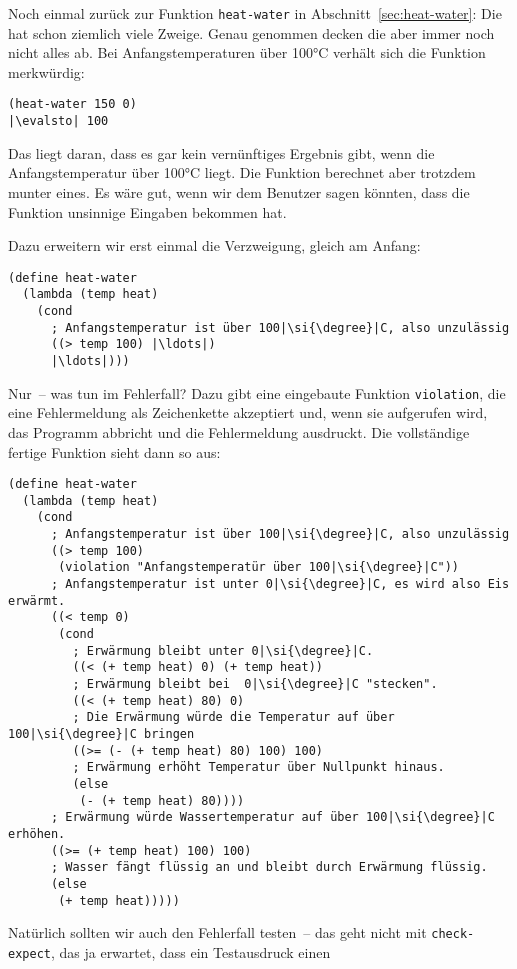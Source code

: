 Noch einmal zurück zur Funktion \lstinline{heat-water} in
Abschnitt~\ref{sec:heat-water}: Die hat schon ziemlich viele Zweige.
Genau genommen decken die aber immer noch nicht alles ab.  %
Bei Anfangstemperaturen über 100\si{\degree}C verhält sich die Funktion merkwürdig:
%
\begin{lstlisting}
(heat-water 150 0)
|\evalsto| 100
\end{lstlisting}
%
Das liegt daran, dass es gar kein vernünftiges Ergebnis gibt, wenn die
Anfangstemperatur über 100\si{\degree}C liegt.  Die Funktion berechnet aber
trotzdem munter eines.  Es wäre gut, wenn wir dem Benutzer sagen
könnten, dass die Funktion unsinnige Eingaben bekommen hat.

Dazu erweitern wir erst einmal die Verzweigung, gleich am Anfang:
%
\begin{lstlisting}
(define heat-water
  (lambda (temp heat)
    (cond
      ; Anfangstemperatur ist über 100|\si{\degree}|C, also unzulässig
      ((> temp 100) |\ldots|)
      |\ldots|)))
\end{lstlisting}
%
Nur~-- was tun im Fehlerfall?  Dazu gibt eine eingebaute Funktion
\lstinline{violation},\label{sec:violation} die eine Fehlermeldung als Zeichenkette akzeptiert
und, wenn sie aufgerufen wird, das Programm abbricht und die
Fehlermeldung ausdruckt.  Die vollständige fertige Funktion sieht
dann so aus:
%
\begin{lstlisting}
(define heat-water
  (lambda (temp heat)
    (cond
      ; Anfangstemperatur ist über 100|\si{\degree}|C, also unzulässig
      ((> temp 100)
       (violation "Anfangstemperatür über 100|\si{\degree}|C"))
      ; Anfangstemperatur ist unter 0|\si{\degree}|C, es wird also Eis erwärmt.
      ((< temp 0)
       (cond
         ; Erwärmung bleibt unter 0|\si{\degree}|C.
         ((< (+ temp heat) 0) (+ temp heat))
         ; Erwärmung bleibt bei  0|\si{\degree}|C "stecken".
         ((< (+ temp heat) 80) 0)
         ; Die Erwärmung würde die Temperatur auf über 100|\si{\degree}|C bringen
         ((>= (- (+ temp heat) 80) 100) 100)
         ; Erwärmung erhöht Temperatur über Nullpunkt hinaus.
         (else
          (- (+ temp heat) 80))))
      ; Erwärmung würde Wassertemperatur auf über 100|\si{\degree}|C erhöhen.
      ((>= (+ temp heat) 100) 100)
      ; Wasser fängt flüssig an und bleibt durch Erwärmung flüssig.
      (else
       (+ temp heat)))))
\end{lstlisting}
%
Natürlich sollten wir auch den Fehlerfall testen~-- das geht nicht mit
\lstinline{check-expect}, das ja erwartet, dass ein Testausdruck einen
